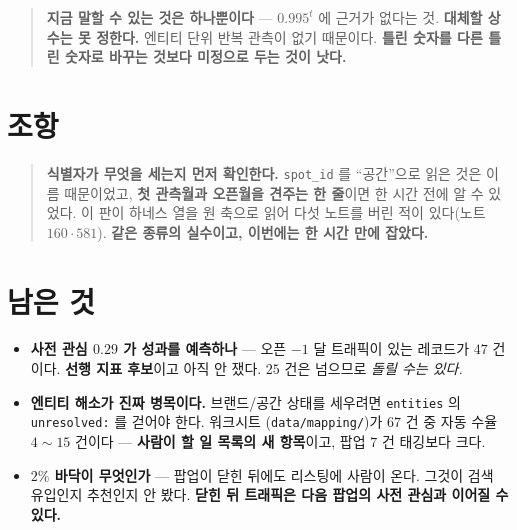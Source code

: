 \documentclass[11pt]{article}
\begin{document}
\begin{quote}
\textbf{지금 말할 수 있는 것은 하나뿐이다} --- $0.995^t$ 에 근거가
없다는 것. \textbf{대체할 상수는 못 정한다.} 엔티티 단위 반복 관측이
없기 때문이다. \textbf{틀린 숫자를 다른 틀린 숫자로 바꾸는 것보다 미정으로
두는 것이 낫다.}
\end{quote}

\section*{조항}

\begin{quote}
\textbf{식별자가 무엇을 세는지 먼저 확인한다.} \texttt{spot\_id} 를
``공간''으로 읽은 것은 이름 때문이었고, \textbf{첫 관측월과 오픈월을
견주는 한 줄}이면 한 시간 전에 알 수 있었다. 이 판이 하네스 열을 원 축으로
읽어 다섯 노트를 버린 적이 있다(노트 $160 \cdot 581$). \textbf{같은 종류의
실수이고, 이번에는 한 시간 만에 잡았다.}
\end{quote}

\section*{남은 것}

\begin{itemize}
\item \textbf{사전 관심 $0.29$ 가 성과를 예측하나} --- 오픈 $-1$ 달 트래픽이
있는 레코드가 $47$ 건이다. \textbf{선행 지표 후보}이고 아직 안 쟀다.
$25$ 건은 넘으므로 \emph{돌릴 수는 있다.}
\item \textbf{엔티티 해소가 진짜 병목이다.} 브랜드/공간 상태를 세우려면
\texttt{entities} 의 \texttt{unresolved:} 를 걷어야 한다. 워크시트
(\texttt{data/mapping/})가 $67$ 건 중 자동 수율 $4\!\sim\!15$ 건이다 ---
\textbf{사람이 할 일 목록의 새 항목}이고, 팝업 $7$ 건 태깅보다 크다.
\item \textbf{$2\%$ 바닥이 무엇인가} --- 팝업이 닫힌 뒤에도 리스팅에 사람이
온다. 그것이 검색 유입인지 추천인지 안 봤다. \textbf{닫힌 뒤 트래픽은
다음 팝업의 사전 관심과 이어질 수 있다.}
\end{itemize}
\end{document}
